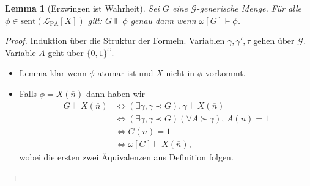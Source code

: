 \documentclass[nofonts]{uebung}
\newtheorem{lemma}[theorem]{Lemma}
\theoremstyle{definition}
\DeclareMathOperator{\dom}{dom}
\begin{document}
\begin{lemma}[Erzwingen ist Wahrheit]\label{lemma:forcing-is-truth}
    Sei $G$ eine $\mathcal G$-generische Menge. 
    Für alle $\phi\in \mathrm{sent}(\mathcal L_{\mathrm{PA}}[X])$ gilt:
    $G\Vdash \phi$ genau dann wenn $\omega[G]\vDash \phi$.
\end{lemma}
\begin{proof}
    Induktion über die Struktur der Formeln. Variablen $\gamma, \gamma', \tau$ gehen über $\mathcal G$. Variable $A$ geht über $\{0,1\}^{\omega}$.
    \begin{itemize}
        \item Lemma klar wenn $\phi$ atomar ist und $X$ nicht in $\phi$ vorkommt.
        \item Falls $\phi=X(\overline n)$ dann haben wir
            \begin{align*}
                G\Vdash X(\overline n) &\iff (\exists \gamma, \gamma\prec G).\,\gamma\Vdash X(\overline n)\\
                             &\iff (\exists \gamma, \gamma\prec G)(\forall A\succ \gamma),\, A(n)=1\\
                             &\iff G(n)=1 \\
                             &\iff \omega[G]\vDash X(\overline n),
            \end{align*}
            wobei die ersten zwei Äquivalenzen aus Definition folgen.

\end{itemize}
\end{proof}
\end{document}
